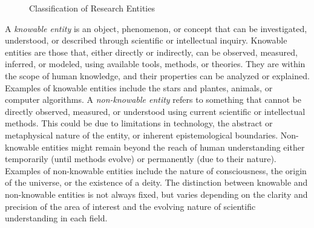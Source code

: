 \begin{figure}[t]
\centering
{}
\caption{Classification of Research Entities}
\end{figure}

A \emph{knowable entity} is an object, phenomenon, or concept that can be investigated, understood, or described through scientific or intellectual inquiry. Knowable entities are those that, either directly or indirectly, can be observed, measured, inferred, or modeled, using available tools, methods, or theories. They are within the scope of human knowledge, and their properties can be analyzed or explained. Examples of knowable entities include the stars and plantes, animals, or computer algorithms. A \emph{non-knowable entity} refers to something that cannot be directly observed, measured, or understood using current scientific or intellectual methods. This could be due to limitations in technology, the abstract or metaphysical nature of the entity, or inherent epistemological boundaries. Non-knowable entities might remain beyond the reach of human understanding either temporarily (until methods evolve) or permanently (due to their nature). Examples of non-knowable entities include the nature of consciousness, the origin of the universe, or the existence of a deity. The distinction between knowable and non-knowable entities is not always fixed, but varies depending on the clarity and precision of the area of interest and the evolving nature of scientific understanding in each field.

